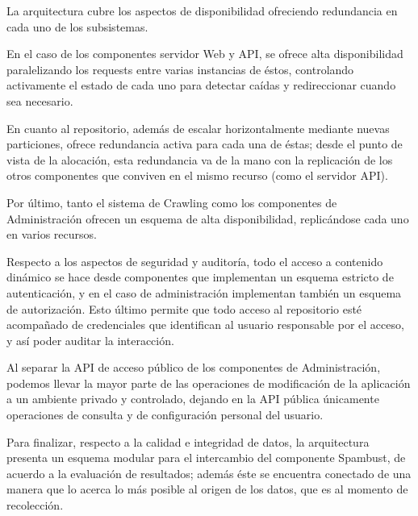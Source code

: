 La arquitectura cubre los aspectos de disponibilidad ofreciendo redundancia en cada uno de los subsistemas.

En el caso de los componentes servidor Web y API, se ofrece alta disponibilidad paralelizando los requests entre varias instancias de \'estos, controlando activamente el estado de cada uno para detectar ca\'idas y redireccionar cuando sea necesario.

En cuanto al repositorio, adem\'as de escalar horizontalmente mediante nuevas particiones, ofrece redundancia activa para cada una de \'estas; desde el punto de vista de la alocaci\'on, esta redundancia va de la mano con la replicaci\'on de los otros componentes que conviven en el mismo recurso (como el servidor API).

Por \'ultimo, tanto el sistema de Crawling como los componentes de Administraci\'on ofrecen un esquema de alta disponibilidad, replic\'andose cada uno en varios recursos.

Respecto a los aspectos de seguridad y auditor\'ia, todo el acceso a contenido din\'amico se hace desde componentes que implementan un esquema estricto de autenticaci\'on, y en el caso de administraci\'on implementan tambi\'en un esquema de autorizaci\'on. Esto \'ultimo permite que todo acceso al repositorio est\'e acompa\~nado de credenciales que identifican al usuario responsable por el acceso, y as\'i poder auditar la interacci\'on.

Al separar la API de acceso p\'ublico de los componentes de Administraci\'on, podemos llevar la mayor parte de las operaciones de modificaci\'on de la aplicaci\'on a un ambiente privado y controlado, dejando en la API p\'ublica \'unicamente operaciones de consulta y de configuraci\'on personal del usuario.

Para finalizar, respecto a la calidad e integridad de datos, la arquitectura presenta un esquema modular para el intercambio del componente Spambust, de acuerdo a la evaluaci\'on de resultados; adem\'as \'este se encuentra conectado de una manera que lo acerca lo m\'as posible al origen de los datos, que es al momento de recolecci\'on.

